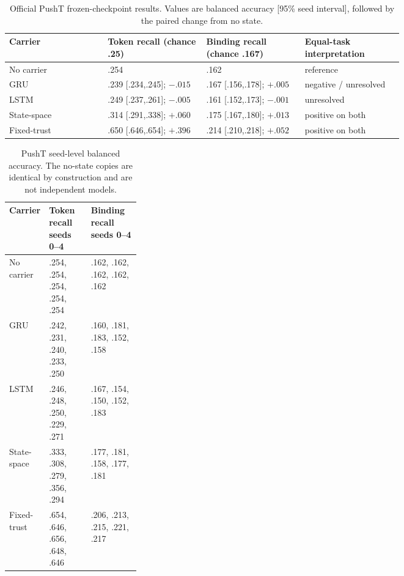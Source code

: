 \begin{table}[H]
\centering
\scriptsize
\setlength{\tabcolsep}{3.2pt}
\renewcommand{\arraystretch}{1.08}
\caption{Official PushT frozen-checkpoint results. Values are balanced accuracy [95\% seed interval], followed by the paired change from no state.}
\begin{tabularx}{\linewidth}{@{}>{\raggedright\arraybackslash}p{0.25\linewidth}*{2}{>{\centering\arraybackslash}p{0.25\linewidth}}Y@{}}
\toprule
Carrier & Token recall (chance .25) & Binding recall (chance .167) & Equal-task interpretation \\
\midrule
No carrier & .254 & .162 & reference \\
GRU & .239 [.234,.245]; $-.015$ & .167 [.156,.178]; $+.005$ & negative / unresolved \\
LSTM & .249 [.237,.261]; $-.005$ & .161 [.152,.173]; $-.001$ & unresolved \\
State-space & .314 [.291,.338]; $+.060$ & .175 [.167,.180]; $+.013$ & positive on both \\
Fixed-trust & .650 [.646,.654]; $+.396$ & .214 [.210,.218]; $+.052$ & positive on both \\
\bottomrule
\end{tabularx}
\end{table}

\begin{table}[H]
\centering
\scriptsize
\setlength{\tabcolsep}{3pt}
\caption{PushT seed-level balanced accuracy. The no-state copies are identical by construction and are not independent models.}
\begin{tabularx}{\linewidth}{@{}>{\raggedright\arraybackslash}p{0.25\linewidth}YY@{}}
\toprule
Carrier & Token recall seeds 0--4 & Binding recall seeds 0--4 \\
\midrule
No carrier & .254, .254, .254, .254, .254 & .162, .162, .162, .162, .162 \\
GRU & .242, .231, .240, .233, .250 & .160, .181, .183, .152, .158 \\
LSTM & .246, .248, .250, .229, .271 & .167, .154, .150, .152, .183 \\
State-space & .333, .308, .279, .356, .294 & .177, .181, .158, .177, .181 \\
Fixed-trust & .654, .646, .656, .648, .646 & .206, .213, .215, .221, .217 \\
\bottomrule
\end{tabularx}
\end{table}

